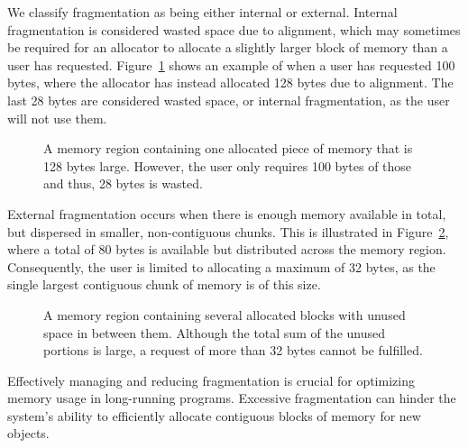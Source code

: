 
We classify fragmentation as being either internal or external. Internal fragmentation is considered wasted space due to alignment, which may sometimes be required for an allocator to allocate a slightly larger block of memory than a user has requested. Figure~\ref{fig:internal_fragmentation} shows an example of when a user has requested 100 bytes, where the allocator has instead allocated 128 bytes due to alignment. The last 28 bytes are considered wasted space, or internal fragmentation, as the user will not use them.

\begin{figure}[H]
    \centering
    \vspace*{0.5cm}
    
    \vspace*{0.5cm}
    \caption{A memory region containing one allocated piece of memory that is 128 bytes large. However, the user only requires 100 bytes of those and thus, 28 bytes is wasted.}
    \label{fig:internal_fragmentation}
\end{figure}

External fragmentation occurs when there is enough memory available in total, but dispersed in smaller, non-contiguous chunks. This is illustrated in Figure~\ref{fig:external_fragmentation}, where a total of 80 bytes is available but distributed across the memory region. Consequently, the user is limited to allocating a maximum of 32 bytes, as the single largest contiguous chunk of memory is of this size.

\begin{figure}[H]
    \centering
    \vspace*{0.5cm}
    \hspace*{1.5cm}
    
    \vspace*{0.5cm}
    \caption{A memory region containing several allocated blocks with unused space in between them. Although the total sum of the unused portions is large, a request of more than 32 bytes cannot be fulfilled.}
    \label{fig:external_fragmentation}
\end{figure}

Effectively managing and reducing fragmentation is crucial for optimizing memory usage in long-running programs. Excessive fragmentation can hinder the system's ability to efficiently allocate contiguous blocks of memory for new objects.

